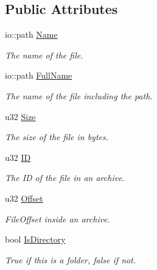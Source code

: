 \subsection*{Public Attributes}
\begin{DoxyCompactItemize}
\item 
io\-::path \hyperlink{structirr_1_1io_1_1_s_file_list_entry_a1d997e72e517823903bd7205ba97cc8c}{Name}
\begin{DoxyCompactList}\small\item\em The name of the file. \end{DoxyCompactList}\item 
io\-::path \hyperlink{structirr_1_1io_1_1_s_file_list_entry_a2aaa0466388e66015138a765a1c9ecab}{Full\-Name}
\begin{DoxyCompactList}\small\item\em The name of the file including the path. \end{DoxyCompactList}\item 
\hypertarget{structirr_1_1io_1_1_s_file_list_entry_a4c49b5f812abf69fd0c6c7e943fed911}{u32 \hyperlink{structirr_1_1io_1_1_s_file_list_entry_a4c49b5f812abf69fd0c6c7e943fed911}{Size}}\label{structirr_1_1io_1_1_s_file_list_entry_a4c49b5f812abf69fd0c6c7e943fed911}

\begin{DoxyCompactList}\small\item\em The size of the file in bytes. \end{DoxyCompactList}\item 
u32 \hyperlink{structirr_1_1io_1_1_s_file_list_entry_ac5da2528c39734795714ea8e21c0d6ed}{I\-D}
\begin{DoxyCompactList}\small\item\em The I\-D of the file in an archive. \end{DoxyCompactList}\item 
\hypertarget{structirr_1_1io_1_1_s_file_list_entry_a9f9348a45b13c6360b491e079eb17c08}{u32 \hyperlink{structirr_1_1io_1_1_s_file_list_entry_a9f9348a45b13c6360b491e079eb17c08}{Offset}}\label{structirr_1_1io_1_1_s_file_list_entry_a9f9348a45b13c6360b491e079eb17c08}

\begin{DoxyCompactList}\small\item\em File\-Offset inside an archive. \end{DoxyCompactList}\item 
\hypertarget{structirr_1_1io_1_1_s_file_list_entry_a503e4206654b704f3f58e1a0badc7fa4}{bool \hyperlink{structirr_1_1io_1_1_s_file_list_entry_a503e4206654b704f3f58e1a0badc7fa4}{Is\-Directory}}\label{structirr_1_1io_1_1_s_file_list_entry_a503e4206654b704f3f58e1a0badc7fa4}

\begin{DoxyCompactList}\small\item\em True if this is a folder, false if not. \end{DoxyCompactList}\end{DoxyCompactItemize}


